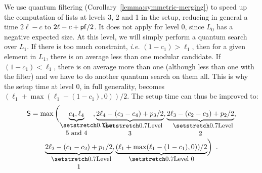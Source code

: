 We use quantum filtering (Corollary~\ref{lemma:symmetric-merging}) to speed up the computation of lists at levels 3, 2 and 1 in the setup, reducing in general a time $2 \ell - c$ to $2 \ell -c + \mathsf{pf}/2$.
It does not apply for level 0, since $L_0$ has a negative expected size. At this level, we will simply perform a quantum search over $L_1$. If there is too much constraint, \emph{i.e.} $(1-c_1) > \ell_1$, then for a given element in $L_1$, there is on average less than one modular candidate. If $(1-c_1) < \ell_1$, there is on average more than one (although less than one with the filter) and we have to do another quantum search on them all. This is why the setup time at level 0, in full generality, becomes $(\ell_1 + \max(\ell_1 - (1-c_1), 0))/2$. The setup time can thus be improved to:
\begin{multline*}
\mathsf{S} = \max \bigg( \undertext[1]{Lv. 5 and 4}{c_4, \ell_4}, \undertext{Level 3}{2\ell_4 - (c_3- c_4) + p_3/2}, \undertext{Level 2}{2\ell_3 - (c_2- c_3) + p_2/2}, \\
\undertext{Level 1}{2\ell_2 - (c_1 - c_2) + p_1/2}, \undertext{Level 0}{ (\ell_1 + \max(\ell_1 - (1 - c_1), 0))/2 } \bigg) \enspace.
\end{multline*}



